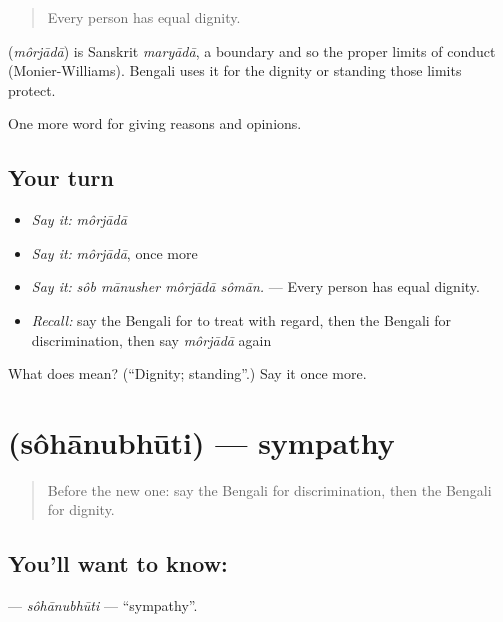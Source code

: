 \begin{quote}
Every person has equal dignity.
\end{quote}

\begin{cousinweb}
\textbf{} (\emph{môrjādā}) is Sanskrit \emph{maryādā}, a boundary and so the proper limits of conduct (Monier-Williams). Bengali uses it for the dignity or standing those limits protect.
\end{cousinweb}

\begin{grammarlens}[title={What you've built}]
One more word for giving reasons and opinions.
\end{grammarlens}

\subsection*{Your turn}
\begin{itemize}
\raggedright
  \item \emph{Say it:} \emph{môrjādā}
  \item \emph{Say it:} \emph{môrjādā}, once more
  \item \emph{Say it:} \emph{sôb mānusher môrjādā sômān.} — Every person has equal dignity.
  \item \emph{Recall:} say the Bengali for to treat with regard, then the Bengali for discrimination, then say \emph{môrjādā} again
\end{itemize}

\begin{tcolorbox}[breakable,colback=teal!4,colframe=teal!35!black,title={Before you move on}]
What does  mean? (\textquotedblleft{}Dignity; standing\textquotedblright{}.) Say it once more.
\end{tcolorbox}
\section[\texorpdfstring{\bn{সহানুভূতি} (sôhānubhūti)}{সহানুভূতি (sôhānubhūti)}]{ (sôhānubhūti) — sympathy}

\label{lesson:BN-C352-sohanubhuti}



\begin{quote}
Before the new one: say the Bengali for discrimination, then the Bengali for dignity.
\end{quote}

\subsection*{You'll want to know: }
\textbf{} — \emph{sôhānubhūti} — \textquotedblleft{}sympathy\textquotedblright{}.


